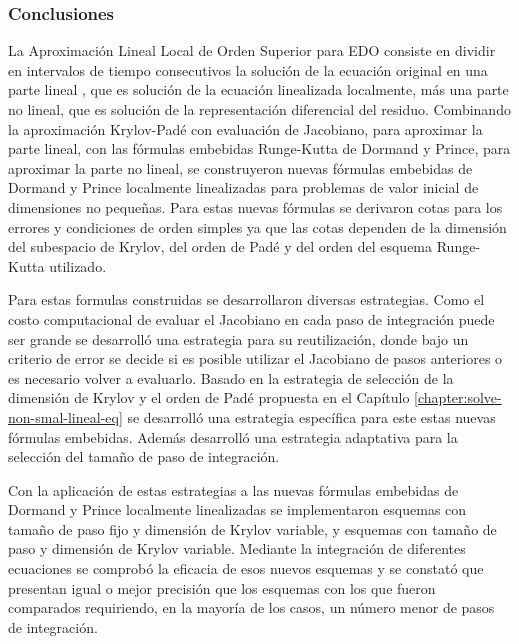 \subsubsection{Conclusiones}
	La Aproximación Lineal Local de Orden Superior para EDO consiste en dividir en intervalos de tiempo consecutivos la solución de la ecuación original en una parte lineal , que es solución de la ecuación linealizada localmente, más una parte no lineal, que es solución de la representación diferencial del residuo. Combinando la aproximación Krylov-Padé con evaluación de Jacobiano, para aproximar la parte lineal, con las fórmulas embebidas Runge-Kutta de Dormand y Prince, para aproximar la parte no lineal, se construyeron nuevas fórmulas embebidas de Dormand y Prince localmente linealizadas para problemas de valor inicial de dimensiones no pequeñas. Para estas nuevas fórmulas se derivaron cotas para los errores y condiciones de orden simples ya que las cotas dependen de la dimensión del subespacio de Krylov, del orden de Padé y del orden del esquema Runge-Kutta utilizado.
	
	Para estas formulas construidas se desarrollaron diversas estrategias. Como el costo computacional de evaluar el Jacobiano en cada paso de integración puede ser grande se desarrolló una estrategia para su reutilización, donde bajo un criterio de error se decide si es posible utilizar el Jacobiano de pasos anteriores o es necesario volver a evaluarlo. Basado en la estrategia de selección de la dimensión de Krylov y el orden de Padé propuesta en el Capítulo \ref{chapter:solve-non-smal-lineal-eq} se desarrolló una estrategia específica para este estas nuevas fórmulas embebidas. Además desarrolló una estrategia adaptativa para la selección del tamaño de paso de integración.
	
	Con la aplicación de estas estrategias a las nuevas fórmulas embebidas de Dormand y Prince localmente linealizadas se implementaron esquemas con tamaño de paso fijo y dimensión de Krylov variable, y esquemas con tamaño de paso y dimensión de Krylov variable. Mediante la integración de diferentes ecuaciones  se comprobó la eficacia de esos nuevos esquemas y se constató que presentan igual o mejor precisión que los esquemas con los que fueron comparados requiriendo, en la mayoría de los casos, un número menor de pasos de integración.
